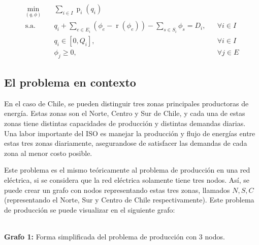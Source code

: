 \documentclass[12pt,twoside]{article}
\begin{document}
	\begin{equation*}\begin{aligned}
		\min_{(q,\phi)} \quad & \sum_{i\in I}\operatorname{p}_i(q_i) \\
		\textrm{s.a.} \quad & q_i+\sum_{e\in E_i}\left(\phi_e-\operatorname{r}(\phi_e)\right)-\sum_{s\in S_i}\phi_s=D_i, & & \forall i \in I \\
		& q_i\in[0,Q_i], & & \forall i \in I \\
		& \phi_j\geq0, & & \forall j \in E
	\end{aligned}\end{equation*}
	
	\newpage

	\subsection{El problema en contexto}	
	\hspace{1cm} En el caso de Chile, se pueden distinguir tres zonas principales productoras de energ\'ia. Estas zonas son el Norte, Centro y Sur de Chile, y cada una de estas zonas tiene distintas capacidades de producci\'on y distintas demandas diarias. Una labor importante del ISO es manejar la producci\'on y flujo de energ\'ias entre estas tres zonas diariamente, asegurandose de satisfacer las demandas de cada zona al menor costo posible.
	
	\hspace{1cm} Este problema es el mismo te\'oricamente al problema de producci\'on en una red el\'ectrica, si se considera que la red el\'ectrica solamente tiene tres nodos. As\'i, se puede crear un grafo con nodos representando estas tres zonas, llamados \(N,S,C\) (representando el Norte, Sur y Centro de Chile respectivamente). Este problema de producci\'on se puede visualizar en el siguiente grafo:
	
	\begin{center}
		 \\
		\textbf{Grafo 1:} Forma simplificada del problema de producci\'on con 3 nodos.
	\end{center}
	
\end{document}
